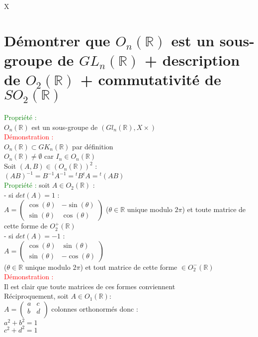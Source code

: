 X\documentclass{article}
\begin{document}
\section{Démontrer que $O_n(\mathbb R)$ est un sous-groupe de $GL_n(\mathbb R)$ + description de $O_2 (\mathbb R)$ + commutativité de $SO_2(\mathbb R)$}
\textcolor{green}{Propriété :} \\
$O_n(\mathbb R)$ est un sous-groupe de $(Gl_n(\mathbb R),X\times )$ \\
\textcolor{red}{Démonstration :} \\
{\boldmath $O_n(\mathbb R) \subset GK_n(\mathbb R)$} par définition \\
{\boldmath $O_n(\mathbb R) \neq \emptyset$} car $I_n \in O_n(\mathbb R)$ \\
Soit {\boldmath $(A,B) \in (O_n(\mathbb R))^2$} : \\
$(AB)^{-1}=B^{-1}A^{-1}={}^tB{}^tA={}^t(AB)$ \\
\textcolor{green}{Propriété :} soit $A\in O_2(\mathbb R)$ : \\
- si $det(A)=1$ : \\
$A=\begin{pmatrix}
\cos(\theta) & -\sin(\theta) \\
\sin(\theta) & \cos(\theta)
\end{pmatrix}$
($\theta \in \mathbb R$ unique modulo $2\pi$)  et toute matrice de cette forme de $O_2^+(\mathbb R)$ \\
- si $det(A)=-1$ : \\
$A=\begin{pmatrix}
\cos(\theta) & \sin(\theta) \\
\sin(\theta) & -\cos(\theta)
\end{pmatrix}$ \\
($\theta \in \mathbb R$ unique modulo $2 \pi$) et tout matrice de cette forme $\in O_2^-(\mathbb R)$ \\
\textcolor{red}{Démonstration :} \\
Il est clair que toute matrices de ces formes conviennent \\
Réciproquement, soit $A\in O_1(\mathbb R) :$ \\
$A=\begin{pmatrix}
a & c \\
b & d \\
\end{pmatrix}$
colonnes orthonormés donc : \\
$a^2+b^2=1$\\
$c^2 +d^2=1$ \\
\end{document}
